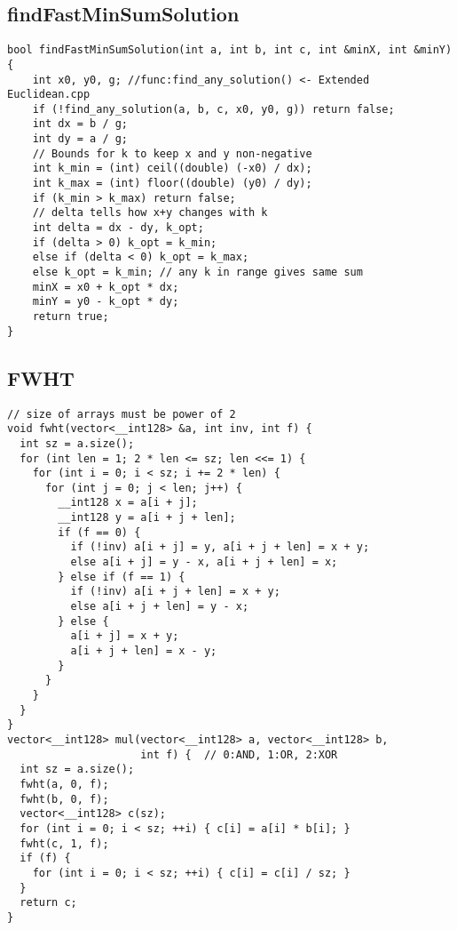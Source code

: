 \documentclass[twoside]{article}
\begin{document}
\begin{multicols*}{2}
{\subsection*{findFastMinSumSolution}
}
\begin{verbatim}
bool findFastMinSumSolution(int a, int b, int c, int &minX, int &minY) {
    int x0, y0, g; //func:find_any_solution() <- Extended Euclidean.cpp
    if (!find_any_solution(a, b, c, x0, y0, g)) return false; 
    int dx = b / g;
    int dy = a / g;
    // Bounds for k to keep x and y non-negative
    int k_min = (int) ceil((double) (-x0) / dx);
    int k_max = (int) floor((double) (y0) / dy);
    if (k_min > k_max) return false;
    // delta tells how x+y changes with k
    int delta = dx - dy, k_opt;
    if (delta > 0) k_opt = k_min;
    else if (delta < 0) k_opt = k_max;
    else k_opt = k_min; // any k in range gives same sum
    minX = x0 + k_opt * dx;
    minY = y0 - k_opt * dy;
    return true;
}

\end{verbatim}

{
\subsection*{FWHT}
}
\begin{verbatim}
// size of arrays must be power of 2
void fwht(vector<__int128> &a, int inv, int f) {
  int sz = a.size();
  for (int len = 1; 2 * len <= sz; len <<= 1) {
    for (int i = 0; i < sz; i += 2 * len) {
      for (int j = 0; j < len; j++) {
        __int128 x = a[i + j];
        __int128 y = a[i + j + len];
        if (f == 0) {
          if (!inv) a[i + j] = y, a[i + j + len] = x + y;
          else a[i + j] = y - x, a[i + j + len] = x;
        } else if (f == 1) {
          if (!inv) a[i + j + len] = x + y;
          else a[i + j + len] = y - x;
        } else {
          a[i + j] = x + y;
          a[i + j + len] = x - y;
        }
      }
    }
  }
}
vector<__int128> mul(vector<__int128> a, vector<__int128> b,
                     int f) {  // 0:AND, 1:OR, 2:XOR
  int sz = a.size();
  fwht(a, 0, f);
  fwht(b, 0, f);
  vector<__int128> c(sz);
  for (int i = 0; i < sz; ++i) { c[i] = a[i] * b[i]; }
  fwht(c, 1, f);
  if (f) {
    for (int i = 0; i < sz; ++i) { c[i] = c[i] / sz; }
  }
  return c;
}


\end{verbatim}
\end{multicols*}
\end{document}
